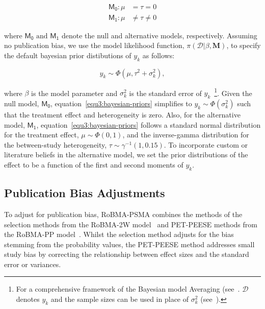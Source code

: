 \documentclass[12pt, english]{article}
\begin{document}
    \begin{align}
        \mathsf{M_0}: \mu &= \tau = 0 \label{equ1:bma-null-model} \\
        \mathsf{M_1}: \mu &\neq \tau \neq 0 \label{equ2:bma-alt-model}
    \end{align}

    where $\mathsf{M_0} \text{ and } \mathsf{M_1}$ denote the null and alternative models, respectively. Assuming no publication bias, we use the model likelihood function, $\pi \left(\mathcal{D} | \beta, \mathbf{M} \right)$, to specify the default bayesian prior distibutions of $y_k$ as follows:

    \begin{equation}
        \label{equ3:bayesian-priors}
        y_k \sim \Phi \left (\mu, \tau^{2} + \sigma_k^{2} \right),
    \end{equation}

    where $\beta$ is the model parameter and $\sigma_k^2$ is the standard error of $y_k$~\footnote{For a comprehensive framework of the Bayesian model Averaging (see~\parencite{fragoso2018, gronau2021, hinne2020}. $\mathcal{D}$ denotes $y_k$ and the sample sizes can be used in place of $\sigma_k^{2}$ (see~\cite{bem2011}).}. Given the null model, $\mathsf{M_0}$, equation~\ref{equ3:bayesian-priors} simplifies to $y_k \sim \Phi(\sigma_k^{2})$ such that the treatment effect and heterogeneity is zero. Also, for the alternative model, $\mathsf{M_1}$, equation~\ref{equ3:bayesian-priors} follows a standard normal distribution for the treatment effect, $\mu \sim \Phi(0,1)$, and the inverse-gamma distribution for the between-study heterogeneity, $\tau \sim \gamma^{-1}(1,0.15)$. To incorporate custom or literature beliefs in the alternative model, we set the prior distributions of the effect to be a function of the first and second moments of $y_k$.

    \subsection{Publication Bias Adjustments}\label{subsec1.0.1:publication-bias-adjustments}
    To adjust for publication bias, RoBMA-PSMA combines the methods of the selection methods from the RoBMA-2W model~\parencite{maier2022} and PET-PEESE methods from the RoBMA-PP model~\parencite{bartos2021, bartos2022}. Whilst the selection method adjusts for the bias stemming from the probability values, the PET-PEESE method addresses small study bias by correcting the relationship between effect sizes and the standard error or variances.
\end{document}
